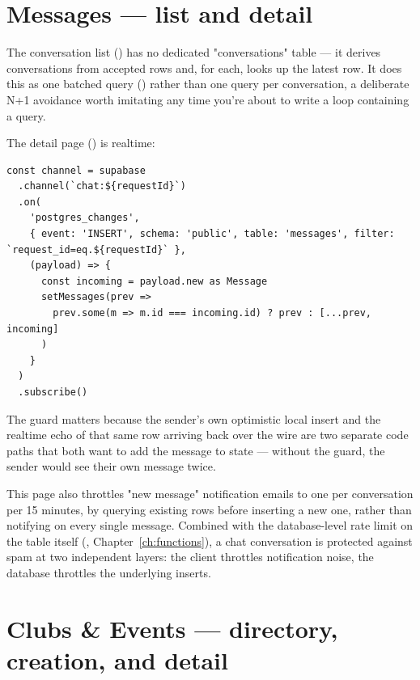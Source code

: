 \section{Messages — list and detail}

The conversation list () has no dedicated "conversations" table — it derives conversations from accepted  rows and, for each, looks up the latest  row. It does this as one batched query () rather than one query per conversation, a deliberate N+1 avoidance worth imitating any time you're about to write a loop containing a query.

The detail page () is realtime:

\begin{lstlisting}[caption={app/(dashboard)/messages/[id]/page.tsx — realtime subscription with de-duplication}]
const channel = supabase
  .channel(`chat:${requestId}`)
  .on(
    'postgres_changes',
    { event: 'INSERT', schema: 'public', table: 'messages', filter: `request_id=eq.${requestId}` },
    (payload) => {
      const incoming = payload.new as Message
      setMessages(prev =>
        prev.some(m => m.id === incoming.id) ? prev : [...prev, incoming]
      )
    }
  )
  .subscribe()
\end{lstlisting}

The  guard matters because the sender's own optimistic local insert and the realtime echo of that same row arriving back over the wire are two separate code paths that both want to add the message to state — without the guard, the sender would see their own message twice.

\begin{olknote}
This page also throttles "new message" notification emails to one per conversation per 15 minutes, by querying existing  rows before inserting a new one, rather than notifying on every single message. Combined with the database-level rate limit on the  table itself (, Chapter~\ref{ch:functions}), a chat conversation is protected against spam at two independent layers: the client throttles notification noise, the database throttles the underlying inserts.
\end{olknote}

\section{Clubs \& Events — directory, creation, and detail}

